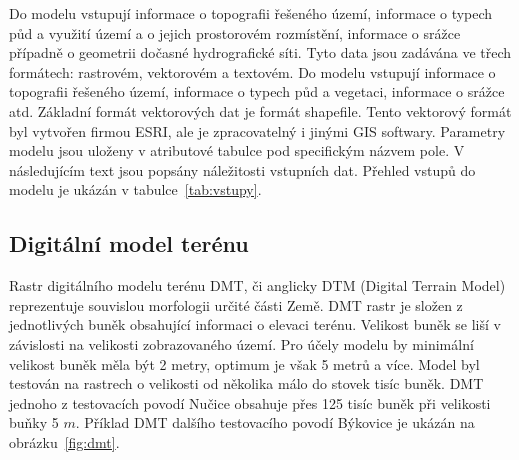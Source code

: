 


Do modelu vstupují informace o topografii řešeného území, informace o typech půd a využití území a o jejich prostorovém rozmístění, informace o srážce případně o geometrii dočasné hydrografické síti.
Tyto data jsou zadávána ve třech formátech: rastrovém, vektorovém a textovém. Do modelu vstupují informace o topografii řešeného území, informace o typech půd a vegetaci, informace o srážce atd. Základní formát vektorových dat je formát shapefile. Tento vektorový formát byl vytvořen firmou ESRI, ale je zpracovatelný i jinými GIS softwary. Parametry modelu jsou uloženy v atributové tabulce pod specifickým názvem pole. 
V následujícím text jsou popsány náležitosti vstupních dat. 
% 
Přehled vstupů do modelu je ukázán v tabulce~\ref{tab:vstupy}.


% 

% 
% 
% 
% 
% 
% 
% 









\subsection{Digitální model terénu} \label{sec:vstupdmt} 

Rastr digitálního modelu terénu DMT, či anglicky DTM (Digital Terrain Model) reprezentuje souvislou morfologii určité části Země. DMT rastr je složen z jednotlivých buněk obsahující informaci o elevaci terénu.  Velikost buněk se liší v závislosti na velikosti zobrazovaného území. Pro účely modelu \smod by minimální velikost buněk měla být 2 metry, optimum je však 5 metrů a více. Model byl testován na rastrech o velikosti od několika málo do stovek tisíc buněk. DMT jednoho z testovacích povodí Nučice obsahuje přes 125 tisíc buněk při velikosti buňky 5 $m$. Příklad DMT dalšího testovacího povodí Býkovice je ukázán na obrázku~\ref{fig:dmt}.


